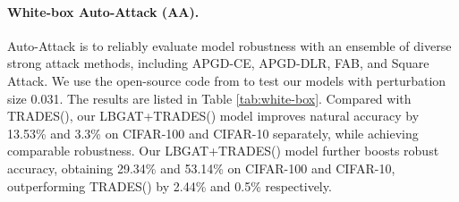 \documentclass[final]{cvpr}
\begin{document}
\paragraph{White-box Auto-Attack (AA).}
Auto-Attack \cite{croce2020reliable} is to reliably evaluate model robustness with an ensemble of diverse strong attack methods, including APGD-CE, APGD-DLR, FAB, and Square Attack. We use the open-source code from \cite{croce2020reliable} to test our models with perturbation size 0.031. The results are listed in Table \ref{tab:white-box}. Compared with TRADES(), our LBGAT+TRADES() model improves natural accuracy by 13.53\% and 3.3\% on CIFAR-100 and CIFAR-10 separately, while achieving comparable robustness.
Our LBGAT+TRADES() model further boosts robust accuracy, obtaining 29.34\% and 53.14\% on CIFAR-100 and CIFAR-10, outperforming TRADES() by 2.44\% and 0.5\% respectively.
\end{document}

